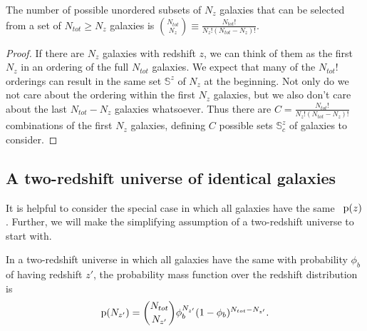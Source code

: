 \begin{lemma}\label{lem:combinations}
	The number of possible unordered subsets of $N_{z}$ galaxies that can be selected from a set of $N_{tot} \geq N_{z}$ galaxies is $\binom{N_{tot}}{N_{z}} \equiv \frac{N_{tot}!}{N_{z}! (N_{tot} - N_{z})!}$.
\end{lemma}
\begin{proof}
	If there are $N_{z}$ galaxies with redshift $z$, we can think of them as the first $N_{z}$ in an ordering of the full $N_{tot}$ galaxies.
	We expect that many of the $N_{tot}!$ orderings can result in the same set $\mathbb{S}^{z}$ of $N_{z}$ at the beginning.
	Not only do we not care about the ordering within the first $N_{z}$ galaxies, but we also don't care about the last $N_{tot} - N_{z}$ galaxies whatsoever.
	Thus there are $C = \frac{N_{tot}!}{N_{z}! (N_{tot} - N_{z})!}$ combinations of the first $N_{z}$ galaxies, defining $C$ possible sets $\mathbb{S}^{z}_{c}$ of galaxies to consider.
\end{proof}


\subsection{A two-redshift universe of identical galaxies}

It is helpful to consider the special case in which all galaxies have the same \pzpdf\ $\mathrm{p}(z)$.
Further, we will make the simplifying assumption of a two-redshift universe to start with.

\begin{theorem}
	In a two-redshift universe in which all galaxies have the same \pzpdf with probability $\phi_{b}$ of having redshift $z'$, the probability mass function over the redshift distribution is
	\begin{equation}
	\eqlabel{eqn:binomial}
	\pr{N_{z'}} = \binom{N_{tot}}{N_{z'}} \phi_{b}^{N_{z'}} (1 - \phi_{b})^{N_{tot} - N_{z'}} .
	\end{equation}
\end{theorem}

